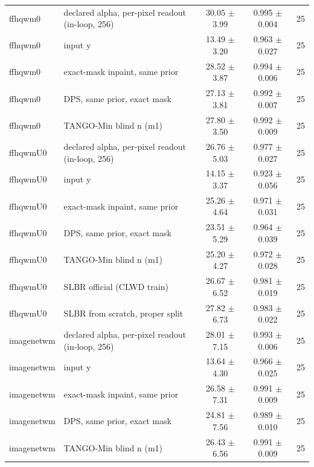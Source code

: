\begin{tabular}{llccc}
\midrule
ffhqwm0 & declared alpha, per-pixel readout (in-loop, 256) & 30.05 $\pm$ 3.99 & 0.995 $\pm$ 0.004 & 25\\
ffhqwm0 & input y & 13.49 $\pm$ 3.20 & 0.963 $\pm$ 0.027 & 25\\
ffhqwm0 & exact-mask inpaint, same prior & 28.52 $\pm$ 3.87 & 0.994 $\pm$ 0.006 & 25\\
ffhqwm0 & DPS, same prior, exact mask & 27.13 $\pm$ 3.81 & 0.992 $\pm$ 0.007 & 25\\
ffhqwm0 & TANGO-Min blind n (m1) & 27.80 $\pm$ 3.50 & 0.992 $\pm$ 0.009 & 25\\
\midrule
ffhqwmU0 & declared alpha, per-pixel readout (in-loop, 256) & 26.76 $\pm$ 5.03 & 0.977 $\pm$ 0.027 & 25\\
ffhqwmU0 & input y & 14.15 $\pm$ 3.37 & 0.923 $\pm$ 0.056 & 25\\
ffhqwmU0 & exact-mask inpaint, same prior & 25.26 $\pm$ 4.64 & 0.971 $\pm$ 0.031 & 25\\
ffhqwmU0 & DPS, same prior, exact mask & 23.51 $\pm$ 5.29 & 0.964 $\pm$ 0.039 & 25\\
ffhqwmU0 & TANGO-Min blind n (m1) & 25.20 $\pm$ 4.27 & 0.972 $\pm$ 0.028 & 25\\
ffhqwmU0 & SLBR official (CLWD train) & 26.67 $\pm$ 6.52 & 0.981 $\pm$ 0.019 & 25\\
ffhqwmU0 & SLBR from scratch, proper split & 27.82 $\pm$ 6.73 & 0.983 $\pm$ 0.022 & 25\\
\midrule
imagenetwm & declared alpha, per-pixel readout (in-loop, 256) & 28.01 $\pm$ 7.15 & 0.993 $\pm$ 0.006 & 25\\
imagenetwm & input y & 13.64 $\pm$ 4.30 & 0.966 $\pm$ 0.025 & 25\\
imagenetwm & exact-mask inpaint, same prior & 26.58 $\pm$ 7.31 & 0.991 $\pm$ 0.009 & 25\\
imagenetwm & DPS, same prior, exact mask & 24.81 $\pm$ 7.56 & 0.989 $\pm$ 0.010 & 25\\
imagenetwm & TANGO-Min blind n (m1) & 26.43 $\pm$ 6.56 & 0.991 $\pm$ 0.009 & 25\\
\bottomrule
\end{tabular}
